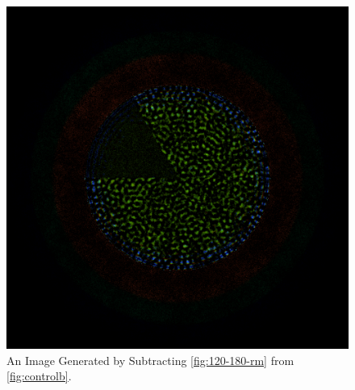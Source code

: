 \begin{figure}[H]
\centering
\includegraphics[width=0.6\linewidth]{figures/120-180/diff-120-180}
\caption{An Image Generated by Subtracting \ref{fig:120-180-rm} from \ref{fig:controlb}.}
\label{fig:120-180-diff}
\end{figure}